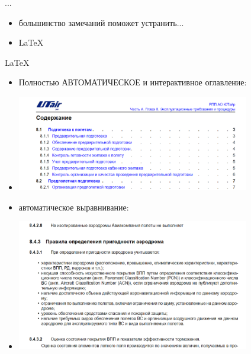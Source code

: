 \documentclass[utf8]{beamer}
\begin{document}
\begin{frame}{...}  
    \begin{itemize}
        \item <1-> большинство замечаний поможет устранить...
        \item <2-> \huge \LaTeX
    \end{itemize}              
\end{frame}

\begin{frame}{LaTeX}  
    \begin{itemize}
        \item <1-> Полностью АВТОМАТИЧЕСКОЕ и интерактивное оглавление:
        \item <1-> \includegraphics[width=0.8\textwidth]{lt01-contents.png} 
        \item <2-> автоматическое выравнивание:
        \item <2-> \includegraphics[width=0.8\textwidth]{lt05-alignes.png}
    \end{itemize}              
\end{frame}
\end{document}
